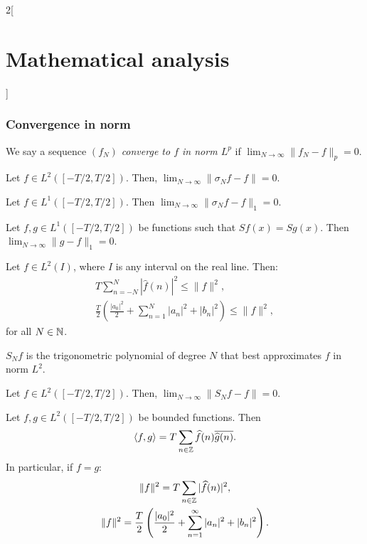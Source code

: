 \documentclass[../../../main.tex]{subfiles}
\begin{document}
\begin{multicols}{2}[\section{Mathematical analysis}]
  \subsubsection{Convergence in norm}
  \begin{definition}
    We say a sequence $(f_N)$ \textit{converge to $f$ in norm $L^p$} if $\displaystyle\lim_{N\to\infty}\|f_N-f\|_p=0$.
  \end{definition}
  \begin{theorem}
    Let $f\in L^2([-T/2,T/2])$. Then, $\displaystyle\lim_{N\to\infty}\|\sigma_Nf-f\|=0$.
  \end{theorem}
  \begin{corollary}
    Let $f\in L^1([-T/2,T/2])$. Then $\displaystyle\lim_{N\to\infty}\|\sigma_Nf-f\|_1=0$.
  \end{corollary}
  \begin{corollary}
    Let $f,g\in L^1([-T/2,T/2])$ be functions such that $Sf(x)=Sg(x)$. Then $\displaystyle\lim_{N\to\infty}\|g-f\|_1=0$.
  \end{corollary}
  \begin{theorem}
    Let $f\in L^2(I)$, where $I$ is any interval on the real line. Then: \begin{gather*}T\sum_{n=-N}^N|\widehat{f}(n)|^2\leq\|f\|^2,\\\frac{T}{2}\left(\frac{|a_0|^2}{2}+\sum_{n=1}^N|a_n|^2+|b_n|^2\right)\leq \|f\|^2,\end{gather*} for all $N\in\mathbb{N} $.
  \end{theorem}
  \begin{theorem}
    $S_Nf$ is the trigonometric polynomial of degree $N$ that best approximates $f$ in norm $L^2$.
  \end{theorem}
  \begin{corollary}
    Let $f\in L^2([-T/2,T/2])$. Then, $\displaystyle\lim_{N\to\infty}\|S_Nf-f\|=0$.
  \end{corollary}
  \begin{theorem}
    Let $f,g\in L^2([-T/2,T/2])$ be bounded functions. Then $$\langle f,g\rangle=T\sum_{n\in\mathbb{Z} }\widehat{f}(n)\overline{\widehat{g}(n)}.$$
    In particular, if $f=g$:
    \begin{gather*}\|f\|^2=T\sum_{n\in\mathbb{Z} }|\widehat{f}(n)|^2,\\\|f\|^2=\frac{T}{2}\left(\frac{|a_0|^2}{2}+\sum_{n=1}^\infty|a_n|^2+|b_n|^2\right).\end{gather*}
  \end{theorem}

\end{multicols}
\end{document}
